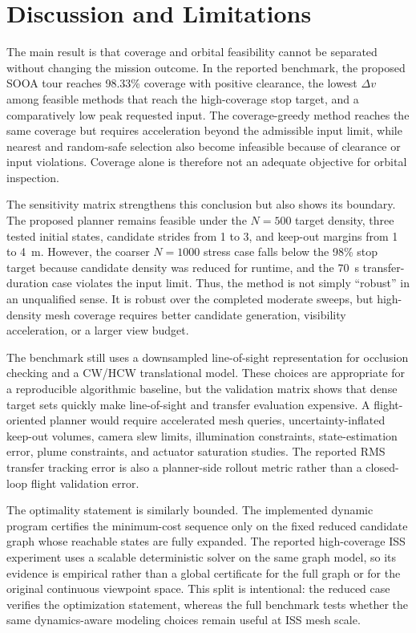 \section{Discussion and Limitations}
\label{sec:discussion}

The main result is that coverage and orbital feasibility cannot be separated
without changing the mission outcome. In the reported benchmark, the
proposed SOOA tour reaches 98.33\% coverage with positive
clearance, the lowest $\Delta v$ among feasible methods that reach the
high-coverage stop target, and a comparatively low peak requested input. The
coverage-greedy method reaches the same coverage but requires acceleration
beyond the admissible input limit, while nearest and random-safe selection
also become infeasible because of clearance or input violations. Coverage
alone is therefore not an adequate objective for orbital inspection.

The sensitivity matrix strengthens this conclusion but also shows its
boundary. The proposed planner remains feasible under the $N=500$ target
density, three tested initial states, candidate strides from 1 to 3, and
keep-out margins from 1 to 4~m. However, the coarser $N=1000$ stress case
falls below the 98\% stop target because candidate density was reduced for
runtime, and the 70~s transfer-duration case violates the input limit. Thus,
the method is not simply ``robust'' in an unqualified sense. It is robust over
the completed moderate sweeps, but high-density mesh coverage requires better
candidate generation, visibility acceleration, or a larger view budget.

The benchmark still uses a downsampled line-of-sight representation for
occlusion checking and a CW/HCW translational model. These choices are
appropriate for a reproducible algorithmic baseline, but the validation
matrix shows that dense target sets quickly make line-of-sight and transfer
evaluation expensive. A flight-oriented planner would require accelerated
mesh queries, uncertainty-inflated keep-out volumes, camera slew limits,
illumination constraints, state-estimation error, plume constraints, and
actuator saturation studies. The reported RMS transfer tracking error is also
a planner-side rollout metric rather than a closed-loop flight validation
error.

The optimality statement is similarly bounded. The implemented dynamic program
certifies the minimum-cost sequence only on the fixed reduced candidate graph
whose reachable states are fully expanded. The reported high-coverage ISS
experiment uses a scalable deterministic solver on the same graph model, so
its evidence is empirical rather than a global certificate for the full graph
or for the original continuous viewpoint space. This split is intentional: the
reduced case verifies the optimization statement, whereas the full benchmark
tests whether the same dynamics-aware modeling choices remain useful at ISS
mesh scale.

